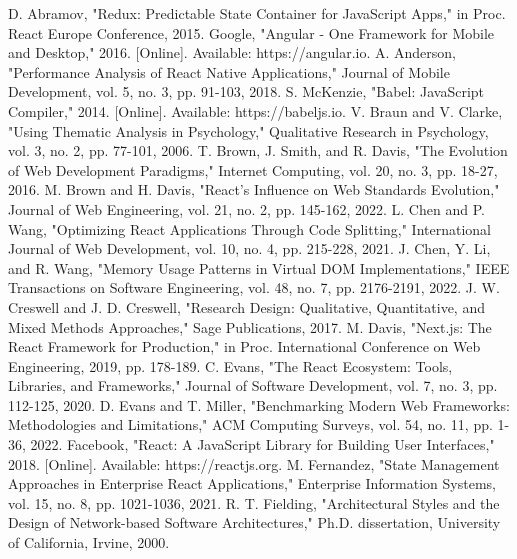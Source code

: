 \begin{thebibliography}{00}
 D. Abramov, "Redux: Predictable State Container for JavaScript Apps," in Proc. React Europe Conference, 2015.
 Google, "Angular - One Framework for Mobile and Desktop," 2016. [Online]. Available: https://angular.io.
 A. Anderson, "Performance Analysis of React Native Applications," Journal of Mobile Development, vol. 5, no. 3, pp. 91-103, 2018.
 S. McKenzie, "Babel: JavaScript Compiler," 2014. [Online]. Available: https://babeljs.io.
 V. Braun and V. Clarke, "Using Thematic Analysis in Psychology," Qualitative Research in Psychology, vol. 3, no. 2, pp. 77-101, 2006.
 T. Brown, J. Smith, and R. Davis, "The Evolution of Web Development Paradigms," Internet Computing, vol. 20, no. 3, pp. 18-27, 2016.
 M. Brown and H. Davis, "React's Influence on Web Standards Evolution," Journal of Web Engineering, vol. 21, no. 2, pp. 145-162, 2022.
 L. Chen and P. Wang, "Optimizing React Applications Through Code Splitting," International Journal of Web Development, vol. 10, no. 4, pp. 215-228, 2021.
 J. Chen, Y. Li, and R. Wang, "Memory Usage Patterns in Virtual DOM Implementations," IEEE Transactions on Software Engineering, vol. 48, no. 7, pp. 2176-2191, 2022.
 J. W. Creswell and J. D. Creswell, "Research Design: Qualitative, Quantitative, and Mixed Methods Approaches," Sage Publications, 2017.
 M. Davis, "Next.js: The React Framework for Production," in Proc. International Conference on Web Engineering, 2019, pp. 178-189.
 C. Evans, "The React Ecosystem: Tools, Libraries, and Frameworks," Journal of Software Development, vol. 7, no. 3, pp. 112-125, 2020.
 D. Evans and T. Miller, "Benchmarking Modern Web Frameworks: Methodologies and Limitations," ACM Computing Surveys, vol. 54, no. 11, pp. 1-36, 2022.
 Facebook, "React: A JavaScript Library for Building User Interfaces," 2018. [Online]. Available: https://reactjs.org.
 M. Fernandez, "State Management Approaches in Enterprise React Applications," Enterprise Information Systems, vol. 15, no. 8, pp. 1021-1036, 2021.
 R. T. Fielding, "Architectural Styles and the Design of Network-based Software Architectures," Ph.D. dissertation, University of California, Irvine, 2000.

\end{thebibliography}
